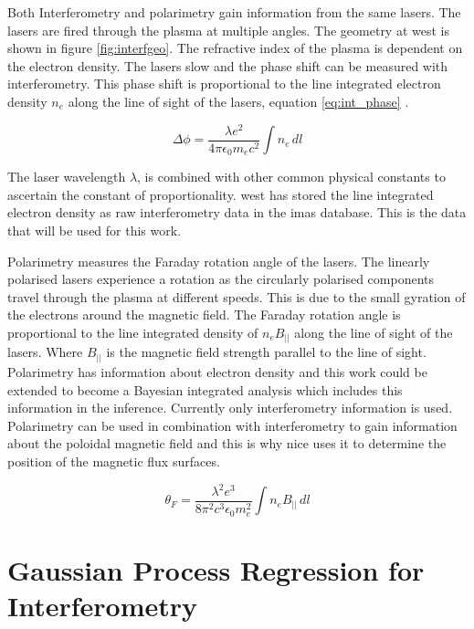Both Interferometry and polarimetry gain information from the same lasers. The lasers are fired through the plasma at multiple angles. The geometry at \gls{west} is shown in figure \ref{fig:interfgeo}. The refractive index of the plasma is dependent on the electron density. The lasers slow and the phase shift can be measured with interferometry. This phase shift is proportional to the line integrated electron density $n_e$ along the line of sight of the lasers, equation \ref{eq:int_phase} \cite{princPlasDiag}.

\begin{equation} 
  \label{eq:int_phase}
  \Delta\phi = \frac{\lambda e^{2}}{4 \pi \epsilon_0 m_e c^2 } \int n_e \, dl
\end{equation}

\noindent The laser wavelength $\lambda$, is combined with other common physical constants to ascertain the constant of proportionality. \gls{west} has stored the line integrated electron density as raw interferometry data in the \gls{imas} database. This is the data that will be used for this work.

Polarimetry measures the Faraday rotation angle of the lasers. The linearly polarised lasers experience a rotation as the circularly polarised components travel through the plasma at different speeds. This is due to the small gyration of the electrons around the magnetic field. The Faraday rotation angle is proportional to the line integrated density of $n_e B_{||}$ along the line of sight of the lasers. Where $B_{||}$ is the magnetic field strength parallel to the line of sight. Polarimetry has information about electron density and this work could be extended to become a Bayesian integrated analysis which includes this information in the inference. Currently only interferometry information is used. Polarimetry can be used in combination with interferometry to gain information about the poloidal magnetic field and this is why \gls{nice} uses it to determine the position of the magnetic flux surfaces.

\begin{equation}
  \label{eq:pol_farad}
  \theta_F = \frac{\lambda^2 e^3}{8 \pi^2 c^3 \epsilon_0 m_e^2} \int n_e B_{||} \, dl
\end{equation}

\section{Gaussian Process Regression for Interferometry}\label{sec:GPRforInterf}

